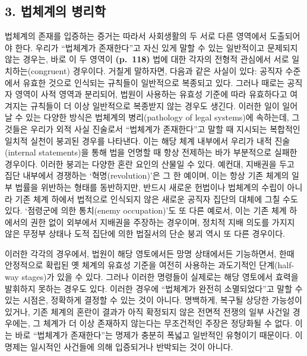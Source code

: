 \subsection{3. 법체계의
병리학}\label{uxbc95uxccb4uxacc4uxc758-uxbcd1uxb9acuxd559}

법체계의 존재를 입증하는 증거는 따라서 사회생활의 두 서로 다른 영역에서
도출되어야 한다. 우리가 ``법체계가 존재한다''고 자신 있게 말할 수 있는
일반적이고 문제되지 않는 경우는, 바로 이 두 영역이 \textbf{(p.~118)}
법에 대한 각자의 전형적 관심에서 서로 일치하는(congruent) 경우이다.
거칠게 말하자면, 다음과 같은 사실이 있다: 공직자 수준에서 유효한 것으로
인식되는 규칙들이 일반적으로 복종되고 있다. 그러나 때로는 공직자 영역이
사적 영역과 분리되어, 법원이 사용하는 유효성 기준에 따라 유효하다고
여겨지는 규칙들이 더 이상 일반적으로 복종받지 않는 경우도 생긴다. 이러한
일이 일어날 수 있는 다양한 방식은 법체계의 병리(pathology of legal
systems)에 속하는데, 그것들은 우리가 외적 사실 진술로서 ``법체계가
존재한다''고 말할 때 지시되는 복합적인 일치적 실천이 붕괴된 경우를
나타낸다. 이는 해당 체계 내부에서 우리가 내적 진술(internal
statements)을 통해 법을 언명할 때 항상 전제하는 바가 부분적으로 실패한
경우이다. 이러한 붕괴는 다양한 혼란 요인의 산물일 수 있다. 예컨대,
지배권을 두고 집단 내부에서 경쟁하는 `혁명(revolution)'은 그 한 예이며,
이는 항상 기존 체계의 일부 법률을 위반하는 형태를 동반하지만, 반드시
새로운 헌법이나 법체계의 수립이 아니라 기존 체계 하에서 법적으로
인식되지 않은 새로운 공직자 집단의 대체에 그칠 수도 있다. `점령군에 의한
통치(enemy occupation)'도 또 다른 예로서, 이는 기존 체계 하에서의 권한
없이 외부에서 지배권을 주장하는 경우이며, 정치적 지배 의도를 가지지 않은
무정부 상태나 도적 집단에 의한 법질서의 단순 붕괴 역시 또 다른 경우이다.

이러한 각각의 경우에서, 법원이 해당 영토에서든 망명 상태에서든
기능하면서, 한때 안정적으로 확립된 옛 체계의 유효성 기준을 여전히
사용하는 과도기적인 단계(half-way stages)가 있을 수 있다. 그러나 이러한
명령들이 실제로는 해당 영토에서 효력을 발휘하지 못하는 경우도 있다.
이러한 경우에 ``법체계가 완전히 소멸되었다''고 말할 수 있는 시점은,
정확하게 결정할 수 있는 것이 아니다. 명백하게, 복구될 상당한 가능성이
있거나, 기존 체계의 혼란이 결과가 아직 확정되지 않은 전면적 전쟁의 일부
사건일 경우에는, 그 체계가 더 이상 존재하지 않는다는 무조건적인 주장은
정당화될 수 없다. 이는 바로 ``법체계가 존재한다''는 명제가 충분히 폭넓고
일반적인 유형이기 때문이다. 이 명제는 일시적인 사건들에 의해 입증되거나
반박되는 것이 아니다.

